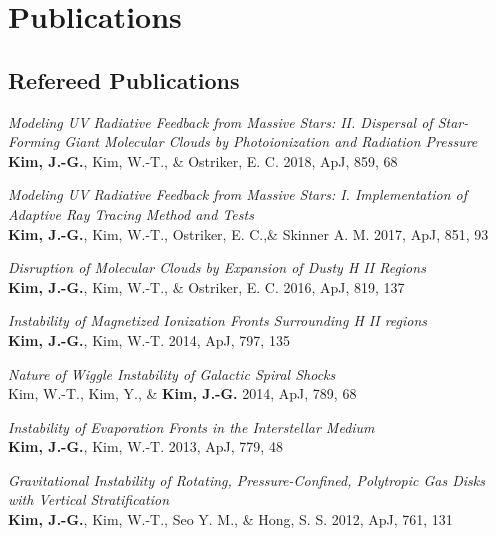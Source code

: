 \section{Publications}

\subsection{Refereed Publications}

\href{https://ui.adsabs.harvard.edu/search/filter_database_fq_database=OR&filter_database_fq_database=database\%3A\%22astronomy\%22&fq=\%7B!type\%3Daqp\%20v\%3D\%24fq_database\%7D&fq_database=(database\%3A\%22astronomy\%22)&q=\%3Dauthor\%3A(\%22Kim\%2C\%20Jeong-Gyu\%22)&sort=date\%20desc\%2C\%20bibcode\%20desc}{\color{dodgerblue}{(ADS
Link)}}

\begin{benumerate}{7}
\item \textit{Modeling UV Radiative Feedback from Massive Stars: II. Dispersal
of Star-Forming Giant Molecular Clouds by Photoionization and Radiation
Pressure} \\ \textbf{Kim, J.-G.}, Kim, W.-T., \& Ostriker, E. C. 2018, ApJ, 859,
68
\item \textit{Modeling UV Radiative Feedback from Massive Stars: I.
Implementation of Adaptive Ray Tracing Method and Tests}\\ \textbf{Kim, J.-G.},
Kim, W.-T., Ostriker, E. C.,\& Skinner A. M. 2017, ApJ, 851, 93
\item \textit{Disruption of Molecular Clouds by Expansion of Dusty H II
Regions}\\ \textbf{Kim, J.-G.}, Kim, W.-T., \& Ostriker, E. C. 2016, ApJ, 819,
137
\item \textit{Instability of Magnetized Ionization Fronts Surrounding H II
regions}\\ \textbf{Kim, J.-G.}, Kim, W.-T. 2014, ApJ, 797, 135
\item \textit{Nature of Wiggle Instability of Galactic Spiral Shocks}\\ Kim,
W.-T., Kim, Y., \& \textbf{Kim, J.-G.} 2014, ApJ, 789, 68
\item \textit{Instability of Evaporation Fronts in the Interstellar Medium}\\
  \textbf{Kim, J.-G.}, Kim, W.-T. 2013, ApJ, 779, 48
\item \textit{Gravitational Instability of Rotating, Pressure-Confined,
    Polytropic Gas Disks with Vertical Stratification} \\ \textbf{Kim, J.-G.},
  Kim, W.-T., Seo Y. M., \& Hong, S. S. 2012, ApJ, 761, 131
\end{benumerate}

